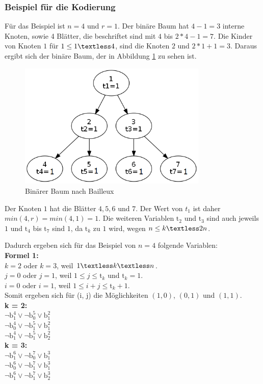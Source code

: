 \documentclass[a4,abstract=on]{scrartcl}
\begin{document}
\subsubsection*{Beispiel für die Kodierung}
Für das Beispiel ist $n=4$ und $r =1$. Der binäre Baum hat $4-1 = 3$ interne Knoten, sowie 4 Blätter, die beschriftet sind mit $4$ bis $2*4-1=7$. Die Kinder von Knoten $1$  für $1 \leq 1 \textless 4$, sind die Knoten $2$ und $2*1 +1=3$. Daraus ergibt sich der binäre Baum, der in Abbildung \ref{fig:baum} zu sehen ist.

\begin{figure}[H]
\centering
\includegraphics[width=9cm]{bailleux.png}
\caption{Binärer Baum nach Bailleux}
\label{fig:baum}
\end{figure}

Der Knoten $1$ hat die Blätter $4,5,6$ und $7$. Der Wert von $t_1$ ist daher $min(4,r) = min(4,1) = 1$. Die weiteren Variablen $\text{t}_2$ und $\text{t}_3$ sind auch jeweils $1$ und $\text{t}_4$ bis $\text{t}_7$ sind $1$, da $\text{t}_k$ zu $1$ wird, wegen $n \leq k \textless 2n$.

Dadurch ergeben sich für das Beispiel von $n=4$ folgende Variablen:\\
\textbf{Formel 1:}\\
$k=2$ oder $k=3$, weil $1 \textless k \textless n$.\\
$j=0$ oder $j=1$, weil $1 \leq j \leq \text{t}_k$ und $\text{t}_k = 1$.\\
$i=0$ oder $i=1$, weil $1\leq i+j \leq \text{t}_{k}+1$.\\
Somit ergeben sich für (i, j) die Möglichkeiten $(1,0)$, $(0,1)$ und $(1,1)$.\\
\textbf{k = 2:}\\
$\neg \text{b}_1^4 \vee \neg \text{b}_0^5 \vee \text{b}_1^2$\\
$\neg \text{b}_0^4 \vee \neg \text{b}_1^5 \vee \text{b}_1^2$\\
$\neg \text{b}_1^4 \vee \neg \text{b}_1^5 \vee \text{b}_2^2$\\
\textbf{k = 3:}\\
$\neg \text{b}_1^6 \vee \neg \text{b}_0^7 \vee \text{b}_1^3$\\
$\neg \text{b}_0^6 \vee \neg \text{b}_1^7 \vee \text{b}_1^3$\\
$\neg \text{b}_1^6 \vee \neg \text{b}_1^7 \vee \text{b}_2^3$\\
\end{document}
